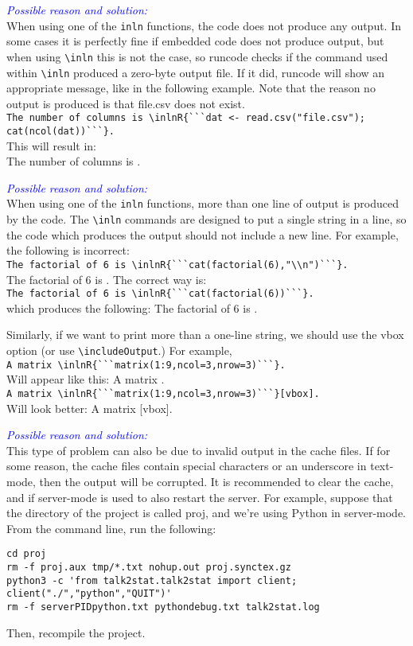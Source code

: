 \documentclass[a4paper,10pt]{article}
\newcommand{\cause}[1] {\noindent\textit{\textcolor{blue}{Possible reason and solution:}}\\#1}
\begin{document}
\cause\bgroup
When using one of the \verb|inln| functions, the code does not produce any output.
In some cases it is perfectly fine if embedded code does not produce output, but when using \verb|\inln| this is not the case, so runcode checks if the command used within \verb|\inln| produced a zero-byte output file. If it did, runcode will show an appropriate message, like in the following example. Note that the reason no output is produced is that file.csv does not exist.\\
\verb|The number of columns is \inlnR{```dat <- read.csv("file.csv"); cat(ncol(dat))```}.|\\
This will result in:\\
The number of columns is  .\\
\egroup

\cause\bgroup
When using one of the \verb|inln| functions, more than one line of output is produced by the code.
The \verb|\inln| commands are designed to put a single string in a line, so the code which produces the output should not include a new line. For example, the following is incorrect:\\
\verb|The factorial of 6 is \inlnR{```cat(factorial(6),"\\n")```}.|\\
The factorial of 6 is .
\noindent
The correct way is:\\
\verb|The factorial of 6 is \inlnR{```cat(factorial(6))```}.|\\
which produces the following: 
The factorial of 6 is .


\noindent
Similarly, if we want to print more than a one-line string, we should use the vbox option (or use \verb|\includeOutput|.) For example,\\
\verb|A matrix \inlnR{```matrix(1:9,ncol=3,nrow=3)```}.|\\
Will appear like this: A matrix .
\\
\verb|A matrix \inlnR{```matrix(1:9,ncol=3,nrow=3)```}[vbox].|\\
Will look better: A matrix [vbox].
\egroup


\cause\bgroup
This type of problem can also be due to invalid output in the cache files. If for some reason, the cache files contain special characters or an underscore in text-mode, then the output will be corrupted. It is recommended to clear the cache, and if server-mode is used to also restart the server. For example, suppose that the directory of the project is called proj, and we're using Python in server-mode. From the command line, run the following:
\begin{Verbatim}
cd proj
rm -f proj.aux tmp/*.txt nohup.out proj.synctex.gz
python3 -c 'from talk2stat.talk2stat import client; client("./","python","QUIT")'
rm -f serverPIDpython.txt pythondebug.txt talk2stat.log
\end{Verbatim}
Then, recompile the project.\\
\egroup
\end{document}
